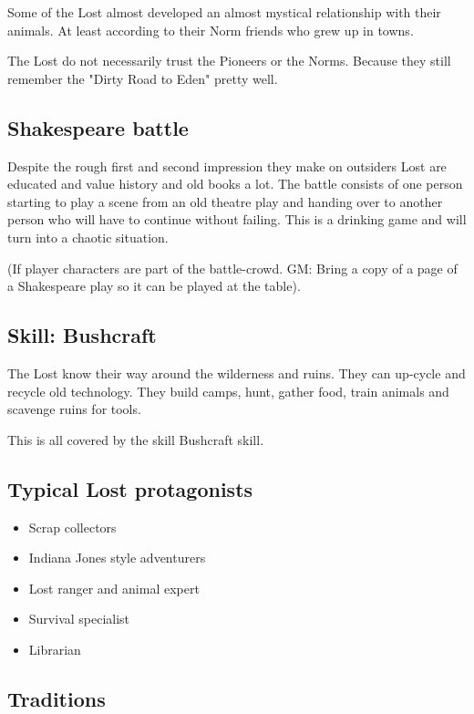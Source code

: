 Some of the Lost almost developed an almost mystical relationship with their animals. At least according to their Norm friends who grew up in towns.

The Lost do not necessarily trust the Pioneers or the Norms. Because they still remember the "Dirty Road to Eden" pretty well.

\subsection{Shakespeare battle}
\label{sec:Shakespeare battle}

Despite the rough first and second impression they make on outsiders Lost are educated and value history and old books a lot. The battle consists of one person starting to play a scene from an old theatre play and handing over to another person who will have to continue without failing. This is a drinking game and will turn into a chaotic situation.

(If player characters are part of the battle-crowd. GM: Bring a copy of a page of a Shakespeare play so it can be played at the table).

\subsection{Skill: Bushcraft}
\label{sec:Bushcraft skill}

The Lost know their way around the wilderness and ruins. They can up-cycle and recycle old technology. They build camps, hunt, gather food, train animals and scavenge ruins for tools.

This is all covered by the skill Bushcraft skill.

\subsection{Typical Lost protagonists}

\begin{itemize}
    \item Scrap collectors
    \item Indiana Jones style adventurers
    \item Lost ranger and animal expert
    \item Survival specialist
    \item Librarian
\end{itemize}

\subsection{Traditions}

